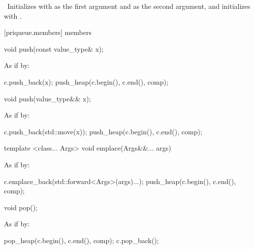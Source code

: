 \begin{itemdescr}
\pnum
\effects\ Initializes  with  as the first argument and 
as the second argument, and initializes  with .
\end{itemdescr}

[priqueue.members]{ members}

%
\begin{itemdecl}
void push(const value_type& x);
\end{itemdecl}

\begin{itemdescr}
\pnum
\effects
As if by:
\begin{codeblock}
c.push_back(x);
push_heap(c.begin(), c.end(), comp);
\end{codeblock}
\end{itemdescr}

%
\begin{itemdecl}
void push(value_type&& x);
\end{itemdecl}

\begin{itemdescr}
\pnum
\effects
As if by:
\begin{codeblock}
c.push_back(std::move(x));
push_heap(c.begin(), c.end(), comp);
\end{codeblock}
\end{itemdescr}

%
\begin{itemdecl}
template <class... Args> void emplace(Args&&... args)
\end{itemdecl}

\begin{itemdescr}
\pnum
\effects
As if by:
\begin{codeblock}
c.emplace_back(std::forward<Args>(args)...);
push_heap(c.begin(), c.end(), comp);
\end{codeblock}
\end{itemdescr}


%
\begin{itemdecl}
void pop();
\end{itemdecl}

\begin{itemdescr}
\pnum
\effects
As if by:
\begin{codeblock}
pop_heap(c.begin(), c.end(), comp);
c.pop_back();
\end{codeblock}
\end{itemdescr}

